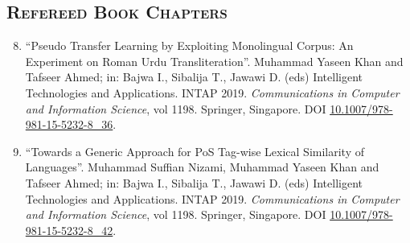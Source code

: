 \documentclass[a4paper, 10pt]{article}
\begin{document}
\subsection*{\normalfont\textsc{Refereed Book Chapters}}
\begin{enumerate}
\setcounter{enumi}{7}
\itemsep-4pt 
 \item ``Pseudo Transfer Learning by Exploiting Monolingual Corpus: An Experiment on Roman Urdu Transliteration''. \textcolor{NavyBlue}{Muhammad Yaseen Khan} and Tafseer Ahmed; in: Bajwa I., Sibalija T., Jawawi D. (eds) Intelligent Technologies and Applications. INTAP 2019. \emph{Communications in Computer and Information Science}, vol 1198. Springer, Singapore. DOI \href{https://doi.org/10.1007/978-981-15-5232-8_36}{10.1007/978-981-15-5232-8\_36}.
  
   \item ``Towards a Generic Approach for PoS Tag-wise Lexical Similarity of Languages''. Muhammad Suffian Nizami, \textcolor{NavyBlue}{Muhammad Yaseen Khan} and Tafseer Ahmed; in: Bajwa I., Sibalija T., Jawawi D. (eds) Intelligent Technologies and Applications. INTAP 2019. \emph{Communications in Computer and Information Science}, vol 1198. Springer, Singapore. DOI \href{https://doi.org/10.1007/978-981-15-5232-8_42}{10.1007/978-981-15-5232-8\_42}.
   
 \end{enumerate}
\end{document}
